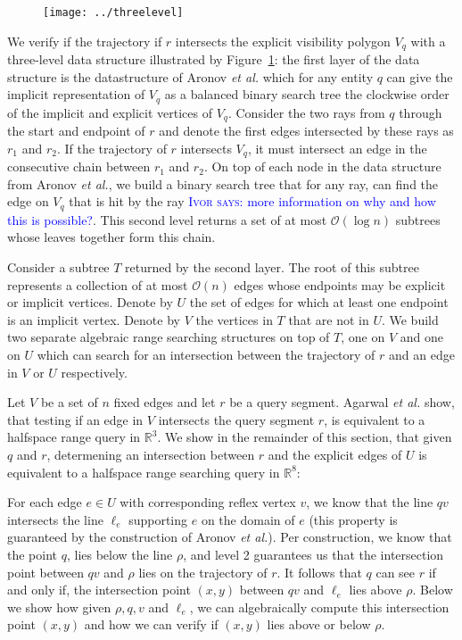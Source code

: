 \documentclass[a4paper, UKenglish]{lipics-v2018}
\newcommand{\myremark}[4]{\textcolor{blue}{\textsc{#1 #2:}} \textcolor{#4}{\textsf{#3}}}
\newcommand{\ivor}[2][says]{\myremark{Ivor}{#1}{#2}{Blue}}
\newcommand{\etal}{\textit{et al.}\xspace}
\begin{document}
\begin{figure}
    \centering
    \texttt{[image: ../threelevel]}
    \caption{  }
    \label{fig:threelevel}
\end{figure}

We verify if the trajectory if $r$ intersects the explicit visibility polygon $V_q$ with a three-level data structure illustrated by Figure~\ref{fig:threelevel}: the first layer of the data structure is the datastructure of Aronov \etal which for any entity $q$ can give the implicit representation of $V_q$ as a balanced binary search tree the clockwise order of the implicit and explicit vertices of $V_q$. Consider the two rays from $q$ through the start and endpoint of $r$ and denote the first edges intersected by these rays as $r_1$ and $r_2$. If the trajectory of $r$ intersects $V_q$, it must intersect an edge in the consecutive chain between $r_1$ and $r_2$. On top of each node in the data structure from Aronov \etal, we build a binary search tree that for any ray, can find the edge on $V_q$ that is hit by the ray \ivor{more information on why and how this is possible?}. This second level returns a set of at most $\mathcal{O}(\log n)$ subtrees whose leaves together form this chain. 

Consider a subtree $T$ returned by the second layer. The root of this subtree represents a collection of at most $\mathcal{O}(n)$ edges whose endpoints may be explicit or implicit vertices. Denote by $U$ the set of edges for which at least one endpoint is an implicit vertex. Denote by $V$ the vertices in $T$ that are not in $U$. We build two separate algebraic range searching structures on top of $T$, one on $V$ and one on $U$ which can search for an intersection between the trajectory of $r$ and an edge in $V$ or $U$ respectively.

Let $V$ be a set of $n$ fixed edges and let $r$ be a query segment. Agarwal \etal show, that testing if an edge in $V$ intersects the query segment $r$, is equivalent to a halfspace range query in $\mathbb{R}^3$. We show in the remainder of this section, that given $q$ and $r$, determening an intersection between $r$ and the explicit edges of $U$ is equivalent to a halfspace range searching query in $\mathbb{R}^8$:

For each edge $e \in U$ with corresponding reflex vertex $v$, we know that the line $qv$ intersects the line $\ell_e$ supporting $e$ on the domain of $e$ (this property is guaranteed by the construction of Aronov \etal \cite{Aronov2002}). Per construction, we know that the point $q$, lies below the line $\rho$, and level 2 guarantees us that the intersection point between $qv$ and $\rho$ lies on the trajectory of $r$. It follows that $q$ can see $r$ if and only if, the intersection point $(x,y)$ between $qv$ and $\ell_e$ lies above $\rho$. Below we show how given $\rho, q, v$ and $\ell_e$, we can algebraically compute this intersection point $(x,y)$ and how we can verify if $(x,y)$ lies above or below $\rho$.
\end{document}
